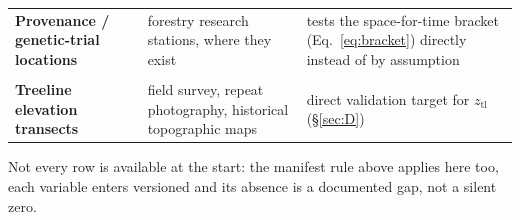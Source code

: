 \begin{xltabular}{\linewidth}{@{}>{\raggedright\arraybackslash\bfseries\sffamily}p{3.4cm}>{\raggedright\arraybackslash}p{4.3cm}>{\raggedright\arraybackslash}X@{}}
Provenance / genetic-trial locations & forestry research stations, where they exist & tests the space-for-time bracket (Eq.~\eqref{eq:bracket}) directly instead of by assumption\\
\\
Treeline elevation transects & field survey, repeat photography, historical topographic maps & direct validation target for $z_{\text{tl}}$ (\S\ref{sec:D})\\
\end{xltabular}

Not every row is available at the start: the manifest rule above applies here too, each variable enters versioned and its absence is a documented gap, not a silent zero.
